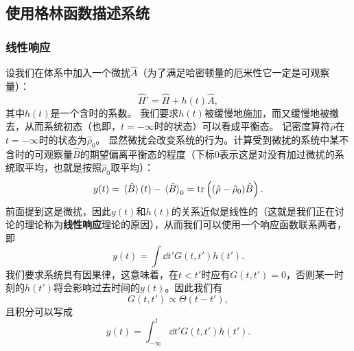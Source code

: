 \documentclass[hyperref, UTF8, a4paper]{ctexart}
\begin{document}
\subsection{使用格林函数描述系统}

\subsubsection{线性响应}\label{sec:linear-response}

设我们在体系中加入一个微扰$\hat{A}$（为了满足哈密顿量的厄米性它一定是可观察量）：
\begin{equation}
    \hat{H}' = \hat{H} + h(t) \hat{A},
\end{equation}
其中$h(t)$是一个含时的系数。
我们要求$h(t)$被缓慢地施加，而又缓慢地被撤去，从而系统初态（也即，$t=-\infty$时的状态）可以看成平衡态。
记密度算符$\hat{\rho}$在$t=-\infty$时的状态为$\hat{\rho}_0$。
显然微扰会改变系统的行为。计算受到微扰的系统中某不含时的可观察量$\hat{B}$的期望偏离平衡态的程度（下标0表示这是对没有加过微扰的系统取平均，也就是按照$\hat{\rho}_0$取平均）：
\[
    y(t) = \expval*{\hat{B}}(t) - \expval*{\hat{B}}_0 = \trace\left((\hat{\rho} - \hat{\rho}_0)\hat{B}\right).
\]
前面提到这是微扰，因此$y(t)$和$h(t)$的关系近似是线性的（这就是我们正在讨论的理论称为\textbf{线性响应}理论的原因），从而我们可以使用一个响应函数联系两者，即
\[
    y(t) = \int \dd{t'} G(t, t') h(t').
\]
我们要求系统具有因果律，这意味着，在$t<t'$时应有$G(t,t')=0$，否则某一时刻的$h(t')$将会影响过去时间的$y(t)$。因此我们有
\[
    G(t,t') \propto \Theta(t-t'),
\]
且积分可以写成
\[
    y(t) = \int_{-\infty}^t \dd{t'} G(t, t') h(t').
\]
\end{document}
